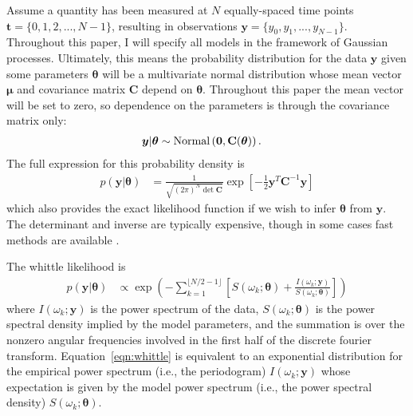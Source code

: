 \documentclass[a4paper, 12pt]{article}
\begin{document}
Assume a quantity has been measured at $N$ equally-spaced time points
$\boldsymbol{t} = \{0, 1, 2, ..., N-1\}$, resulting in observations
$\boldsymbol{y} = \{y_0, y_1, ..., y_{N-1}\}$.
Throughout this paper, I will specify all models in the framework of
Gaussian processes. Ultimately, this means the probability distribution for
the data $\boldsymbol{y}$ given some parameters $\boldsymbol{\theta}$ will
be a multivariate normal distribution whose mean vector $\boldsymbol{\mu}$
and covariance matrix $\mathbf{C}$ depend on $\boldsymbol{\theta}$. Throughout
this paper the mean vector will be set to zero, so dependence on the parameters
is through the covariance matrix only:
\begin{align}
\boldsymbol{y} | \boldsymbol{\theta} &\sim
    \textnormal{Normal}\left(\boldsymbol{0},
                             \mathbf{C}(\boldsymbol{\theta})\right).
\end{align}
The full expression for this probability density is
\begin{align}
p(\boldsymbol{y} | \boldsymbol{\theta})
    &= \frac{1}{\sqrt{(2\pi)^N\det \mathbf{C}}}
        \exp\left[-\frac{1}{2}
                    \boldsymbol{y}^T
                    \mathbf{C}^{-1}
                    \boldsymbol{y}\right]
\end{align}
which also provides the exact likelihood function if we wish to infer
$\boldsymbol{\theta}$ from $\boldsymbol{y}$. The determinant and inverse
are typically expensive, though in some cases fast methods are available
\citep[e.g.][]{mackay, hodlr, celerite}.

The whittle likelihood is
\begin{align}
p(\boldsymbol{y} | \boldsymbol{\theta})
    &\propto \exp\left(-\sum_{k=1}^{\lfloor N/2 - 1 \rfloor}
         \left[S(\omega_k; \boldsymbol{\theta})
         + \frac{I(\omega_k; \boldsymbol{y})}
                {S(\omega_k; \boldsymbol{\theta})}\right]
                \right)
\label{eqn:whittle}
\end{align}
where $I(\omega_k; \boldsymbol{y})$ is the power spectrum of the data,
$S(\omega_k; \boldsymbol{\theta})$ is the power spectral density implied
by the model parameters, and the summation is over the nonzero angular frequencies
involved in the first half of the discrete fourier transform.
Equation~\ref{eqn:whittle} is equivalent to an exponential distribution
for the empirical power spectrum (i.e., the periodogram)
$I(\omega_k; \boldsymbol{y})$ whose expectation is given by the
model power spectrum (i.e., the power spectral density)
$S(\omega_k; \boldsymbol{\theta})$.
\end{document}
